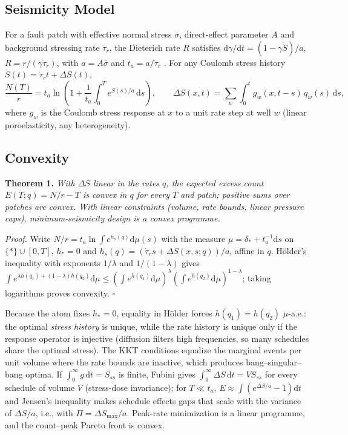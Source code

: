 \documentclass[draft]{agujournal2019}
\begin{document}
\subsection{Seismicity Model}
For a fault patch with effective normal stress $\bar\sigma$, direct-effect parameter $A$ and background stressing rate $\dot\tau_r$, the
Dieterich rate $R$ satisfies $\mathrm{d}\gamma/\mathrm{d}t=(1-\gamma\dot S)/a$, $R=r/(\gamma\dot\tau_r)$, with $a=A\bar\sigma$ and
$t_a=a/\dot\tau_r$ \cite{Dieterich1994,HeimissonSegall2018}. For any Coulomb stress history $S(t)=\dot\tau_r t+\Delta S(t)$,
\begin{equation}
\frac{N(T)}{r}=t_a\ln\!\left(1+\frac{1}{t_a}\int_0^T e^{S(s)/a}\,\mathrm{d}s\right),\qquad
\Delta S(x,t)=\sum_w\int_0^t g_w(x,t-s)\,q_w(s)\,\mathrm{d}s ,
\label{eq:N}
\end{equation}
where $g_w$ is the Coulomb stress response at $x$ to a unit rate step at well $w$ (linear poroelasticity, any heterogeneity).

\subsection{Convexity}
\textbf{Theorem 1.} \emph{With $\Delta S$ linear in the rates $q$, the expected excess count $E(T;q)=N/r-T$ is convex in $q$ for every $T$
and patch; positive sums over patches are convex. With linear constraints (volume, rate bounds, linear pressure caps), minimum-seismicity
design is a convex programme.}

\emph{Proof.} Write $N/r=t_a\ln\int e^{h_s(q)}\mathrm{d}\mu(s)$ with the measure $\mu=\delta_*+t_a^{-1}\mathrm{d}s$ on
$\{*\}\cup[0,T]$, $h_*=0$ and $h_s(q)=(\dot\tau_r s+\Delta S(x,s;q))/a$, affine in $q$. Hölder's inequality with exponents $1/\lambda$ and
$1/(1-\lambda)$ gives $\int e^{\lambda h(q_1)+(1-\lambda)h(q_2)}\mathrm{d}\mu\le(\int e^{h(q_1)}\mathrm{d}\mu)^\lambda(\int e^{h(q_2)}\mathrm{d}\mu)^{1-\lambda}$;
taking logarithms proves convexity. $\square$

Because the atom fixes $h_*=0$, equality in Hölder forces $h(q_1)=h(q_2)$ $\mu$-a.e.: the optimal \emph{stress history} is unique, while
the rate history is unique only if the response operator is injective (diffusion filters high frequencies, so many schedules share the
optimal stress). The KKT conditions equalize the marginal events per unit volume where the rate bounds are inactive, which produces
bang--singular--bang optima. If $\int_0^\infty g\,\mathrm{d}t=S_{ss}$ is finite, Fubini gives $\int_0^\infty\Delta S\,\mathrm{d}t=VS_{ss}$
for every schedule of volume $V$ (stress-dose invariance); for $T\ll t_a$, $E\approx\int(e^{\Delta S/a}-1)\mathrm{d}t$ and Jensen's
inequality makes schedule effects gaps that scale with the variance of $\Delta S/a$, i.e., with $\Pi=\Delta S_{\max}/a$. Peak-rate
minimization is a linear programme, and the count--peak Pareto front is convex.
\end{document}

